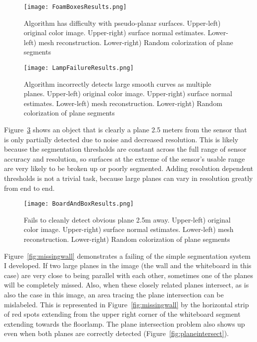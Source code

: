 \begin{figure}[!htpb]
    \centering
    \texttt{[image: FoamBoxesResults.png]}
    \caption{Algorithm has difficulty with pseudo-planar surfaces. Upper-left) original color image. Upper-right) surface normal estimates. Lower-left) mesh reconstruction. Lower-right) Random colorization of plane segments}
    \label{fig:foamboxes}
\end{figure}

\begin{figure}[!htpb]
    \centering
    \texttt{[image: LampFailureResults.png]}
    \caption{Algorithm incorrectly detects large smooth curves as multiple planes. Upper-left) original color image. Upper-right) surface normal estimates. Lower-left) mesh reconstruction. Lower-right) Random colorization of plane segments}
    \label{fig:lampcurve}
\end{figure}

Figure~\ref{fig:distantsmallplane} shows an object that is clearly a plane 2.5 meters from the sensor that is only partially detected due to noise and decreased resolution. This is likely because the segmentation thresholds are constant across the full range of sensor accuracy and resolution, so surfaces at the extreme of the sensor's usable range are very likely to be broken up or poorly segmented. Adding resolution dependent thresholds is not a trivial task, because large planes can vary in resolution greatly from end to end.

\begin{figure}[!htpb]
    \centering
    \texttt{[image: BoardAndBoxResults.png]}
    \caption{Fails to cleanly detect obvious plane 2.5m away. Upper-left) original color image. Upper-right) surface normal estimates. Lower-left) mesh reconstruction. Lower-right) Random colorization of plane segments}
    \label{fig:distantsmallplane}
\end{figure}

Figure~\ref{fig:missingwall} demonstrates a failing of the simple segmentation system I developed. If two large planes in the image (the wall and the whiteboard in this case) are very close to being parallel with each other, sometimes one of the planes will be completely missed. Also, when these closely related planes intersect, as is also the case in this image, an area tracing the plane intersection can be mislabeled. This is represented in Figure~\ref{fig:missingwall} by the horizontal strip of red spots extending from the upper right corner of the whiteboard segment extending towards the floorlamp. The plane intersection problem also shows up even when both planes are correctly detected (Figure~\ref{fig:planeintersect}).


